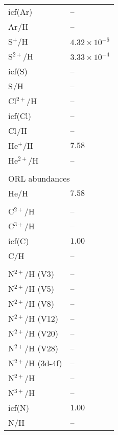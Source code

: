 \begin{longtable}[l]{ll}
 icf(Ar)                             & -- \\
 Ar$^{}$/H                           & -- \\
 S$^{+}$/H                           & $  4.32\times 10^{ -6}$\\
 S$^{2+}$/H                          & $  3.33\times 10^{ -4}$\\
 icf(S)                              & -- \\
 S$^{}$/H                            & -- \\
 Cl$^{2+}$/H                         & -- \\
 icf(Cl)                             & -- \\
 Cl$^{}$/H                           & -- \\
 He$^{+}$/H                          & $  7.58$\\
 He$^{2+}$/H                         & -- \\
 \vspace{0.2cm}\\\multicolumn{2}{l}{ORL abundances}\\ \hline
 He/H                                & $  7.58$\\
 \\
 C$^{2+}$/H                          & -- \\
 C$^{3+}$/H                          & -- \\
 icf(C)                              & $  1.00$\\
 C/H                                 & -- \\
 \\
 N$^{2+}$/H (V3)                     & -- \\
 N$^{2+}$/H (V5)                     & -- \\
 N$^{2+}$/H (V8)                     & -- \\
 N$^{2+}$/H (V12)                    & -- \\
 N$^{2+}$/H (V20)                    & -- \\
 N$^{2+}$/H (V28)                    & -- \\
 N$^{2+}$/H (3d-4f)                  & -- \\
 N$^{2+}$/H                          & -- \\
 N$^{3+}$/H                          & -- \\
 icf(N)                              & $  1.00$\\
 N/H                                 & -- \\

\end{longtable}
